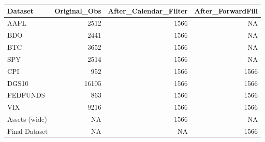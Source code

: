 
\begin{tabular}{lrrr}
\toprule
Dataset & Original\_Obs & After\_Calendar\_Filter & After\_ForwardFill\\
\midrule
AAPL & 2512 & 1566 & NA\\
BDO & 2441 & 1566 & NA\\
BTC & 3652 & 1566 & NA\\
SPY & 2514 & 1566 & NA\\
CPI & 952 & 1566 & 1566\\
\addlinespace
DGS10 & 16105 & 1566 & 1566\\
FEDFUNDS & 863 & 1566 & 1566\\
VIX & 9216 & 1566 & 1566\\
Assets (wide) & NA & 1566 & NA\\
Final Dataset & NA & NA & 1566\\
\bottomrule
\end{tabular}